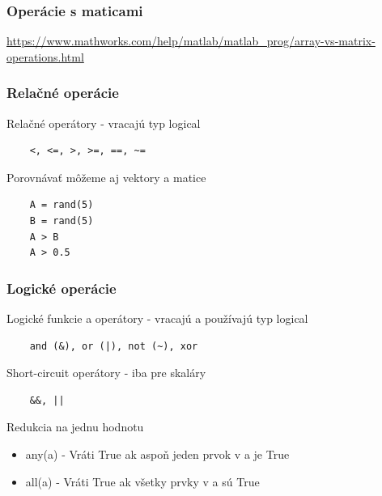 \documentclass{beamer}
\begin{document}
\begin{frame}
  \frametitle{Operácie s maticami}
  \noindent{}  
  \url{https://www.mathworks.com/help/matlab/matlab_prog/array-vs-matrix-operations.html}
\end{frame}

\begin{frame}[fragile]
  \frametitle{Relačné operácie}
  \begin{block}{Relačné operátory - vracajú typ logical}
  \begin{verbatim}
    <, <=, >, >=, ==, ~=\end{verbatim}  
  \end{block}
  
  \pause
  
  \begin{block}{Porovnávať môžeme aj vektory a matice}
  \begin{verbatim}
    A = rand(5)
    B = rand(5)
    A > B
    A > 0.5 \end{verbatim}
  \end{block}
\end{frame}

\begin{frame}[fragile]
  \frametitle{Logické operácie}
  \begin{block}{Logické funkcie a operátory - vracajú a používajú typ logical}
  \begin{verbatim}
    and (&), or (|), not (~), xor\end{verbatim}  
  \end{block}
  
  \begin{block}{Short-circuit operátory - iba pre skaláry}
  \begin{verbatim}
    &&, ||\end{verbatim}  
  \end{block}
  
  
  \pause
  
  \begin{block}{Redukcia na jednu hodnotu}
  \begin{itemize}
    \item any(a) - Vráti True ak aspoň jeden prvok v a je True
    \item all(a) - Vráti True ak všetky prvky v a sú True
  \end{itemize}
  \end{block}    
\end{frame}
\end{document}
